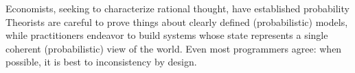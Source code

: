 
Economists, seeking to characterize rational thought, have established  probability%
%
Theorists are careful to prove things about clearly defined (probabilistic) models, 
while practitioners endeavor to build systems
    whose state represents a single coherent (probabilistic) 
        view of the world. 
Even most programmers agree: 
    when possible, it is best to inconsistency by design. 
%
%
